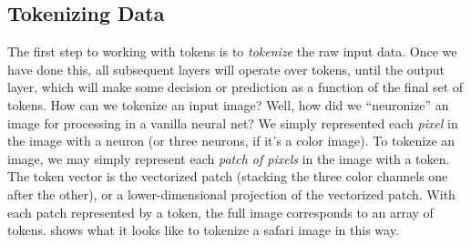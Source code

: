 




\subsection{Tokenizing Data}
The first step to working with tokens is to \textit{tokenize} the raw input data. Once we have done this, all subsequent layers will operate over tokens, until the output layer, which will make some decision or prediction as a function of the final set of tokens. How can we tokenize an input image? Well, how did we ``neuronize'' an image for processing in a vanilla neural net? We simply represented each \textit{pixel} in the image with a neuron (or three neurons, if it's a color image). To tokenize an image, we may simply represent each \textit{patch of pixels} in the image with a token. The token vector is the vectorized patch (stacking the three color channels one after the other), or a lower-dimensional projection of the vectorized patch. 
With each patch represented by a token, the full image corresponds to an array of tokens. \Fig{\ref{fig:transformers:tokenization}} shows what it looks like to tokenize a safari image in this way.


